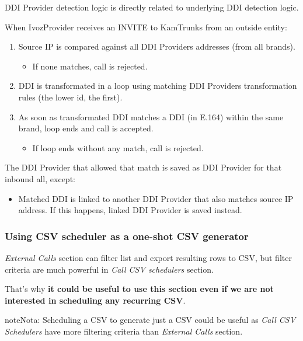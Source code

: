 \documentclass[letterpaper,10pt,spanish]{sphinxmanual}
\begin{document}
DDI Provider detection logic is directly related to underlying DDI detection logic.

When IvozProvider receives an INVITE to KamTrunks from an outside entity:
\begin{enumerate}
\item {} 
Source IP is compared against all DDI Providers addresses (from all brands).
\begin{itemize}
\item {} 
If none matches, call is rejected.

\end{itemize}

\item {} 
DDI is transformated in a loop using matching DDI Providers transformation rules (the lower id, the first).

\item {} 
As soon as transformated DDI matches a DDI (in E.164) within the same brand, loop ends and call is accepted.
\begin{itemize}
\item {} 
If loop ends without any match, call is rejected.

\end{itemize}

\end{enumerate}

The DDI Provider that allowed that match is saved as DDI Provider for that inbound all, except:
\begin{itemize}
\item {} 
Matched DDI is linked to another DDI Provider that also matches source IP address. If this happens, linked DDI Provider
is saved instead.

\end{itemize}


\subsubsection{Using CSV scheduler as a one-shot CSV generator}
\label{administration_portal/brand/calls/call_csv_schedulers:using-csv-scheduler-as-a-one-shot-csv-generator}
\emph{External Calls} section can filter list and export resulting rows to CSV, but filter criteria are much powerful in
\emph{Call CSV schedulers} section.

That's why \textbf{it could be useful to use this section even if we are not interested in scheduling any recurring CSV}.

\begin{notice}{note}{Nota:}
Scheduling a CSV to generate just a CSV could be useful as \emph{Call CSV Schedulers} have more filtering criteria
than \emph{External Calls} section.
\end{notice}
\end{document}
